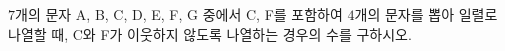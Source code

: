 $7$개의 문자 A, B, C, D, E, F, G 중에서 C, F를 포함하여 \mbox{$4$개의} 문자를 뽑아 일렬로 나열할 때, C와 F가 이웃하지 않도록 나열하는 경우의 수를 구하시오.
